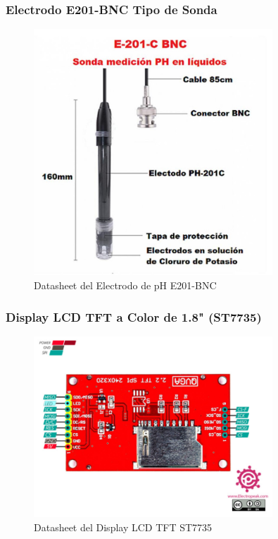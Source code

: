 \documentclass[a4paper,12pt]{article}
\begin{document}
	\subsubsection{Electrodo E201-BNC Tipo de Sonda}
	\begin{figure}[H]
		\centering
		\includegraphics[width=0.8\textwidth]{electrodo.png}
		\caption{Datasheet del Electrodo de pH E201-BNC}
		\label{fig:electrodo_datasheet}
	\end{figure}
	
	\subsubsection{Display LCD TFT a Color de 1.8" (ST7735)}
	\begin{figure}[H]
		\centering
		\includegraphics[width=0.8\textwidth]{display.png}
		\caption{Datasheet del Display LCD TFT ST7735}
		\label{fig:display_datasheet}
	\end{figure}
	
\end{document}

